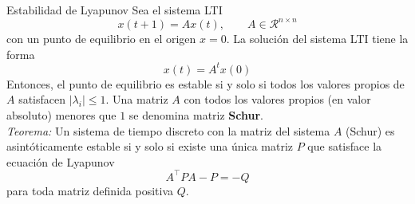 \documentclass[aspectratio=169,dvipsnames]{beamer}
\begin{document}
\begin{frame}{Estabilidad de Lyapunov}
Sea el sistema LTI
\begin{equation*}
    x(t+1)=A x(t), \qquad A \in \mathcal{R}^{n\times n}
\end{equation*}
con un punto de equilibrio en el origen $x=0$. La solución del sistema LTI tiene la forma
\begin{equation*}
    x(t)=A^t x(0)
\end{equation*}
Entonces, el punto de equilibrio es estable si y solo si todos los valores propios de $A$ satisfacen $|\lambda_i|\leq 1$. Una matriz $A$ con todos los valores propios (en valor absoluto) menores que $1$ se denomina matriz {\bf Schur}.\\

{\it Teorema:} Un sistema de tiempo discreto con la matriz del sistema $A$ (Schur) es asintóticamente estable si y solo si existe una única matriz $P$ que satisface la ecuación de Lyapunov
\begin{equation*}
    A^{\top}PA-P=-Q
\end{equation*}
para toda matriz definida positiva $Q$.
\end{frame}
\end{document}
